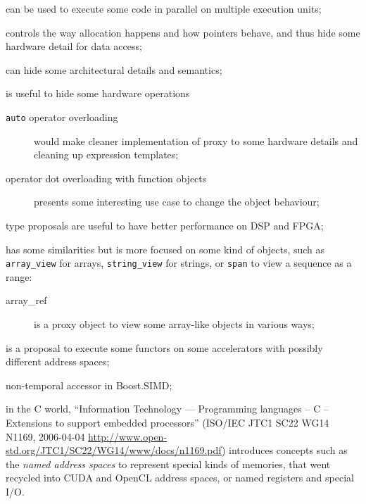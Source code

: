 \documentclass[a4paper]{article}
\begin{document}
\begin{description}
\item[\texttt{thread}] can be used to execute some code in parallel
  on multiple execution units;
\item[\texttt{allocator}] controls the way allocation happens and how
  pointers behave, and thus hide some hardware detail for data access;
\item[constructors and destructors] can hide some architectural details
  and semantics;
\item[operator overloading] is useful to hide some hardware
  operations
  \begin{description}
  \item[\texttt{auto} operator overloading] would make cleaner
    implementation of proxy to some hardware details and cleaning up
    expression templates;
  \item[operator dot overloading with function objects]
    \cite{C++:P0060R0:function_operator_dot} presents some interesting
    use case to change the object behaviour;
  \end{description}
\item[fixed-point] type proposals are useful to have better
  performance on DSP and FPGA;
\item[the concept of view] has some similarities but is more focused
  on some kind of objects, such as \lstinline|array_view| for arrays,
  \lstinline|string_view| for strings, or \lstinline|span| to view a
  sequence as a range:
  \begin{description}
  \item[array\_ref] \cite{C++:P0009R1:array_ref} is a proxy object to
    view some array-like objects in various ways;
  \end{description}
\item[SYCL] is a proposal to execute some functors on some
  accelerators with possibly different address spaces;
\item non-temporal accessor in Boost.SIMD;
\item[ISO/IEC TR 18037] in the C world, ``Information Technology ---
  Programming languages -- C -- Extensions to support embedded
  processors'' (ISO/IEC JTC1 SC22 WG14 N1169, 2006-04-04
  \url{http://www.open-std.org/JTC1/SC22/WG14/www/docs/n1169.pdf})
  introduces concepts such as the \emph{named address spaces} to
  represent special kinds of memories, that went recycled into CUDA
  and OpenCL address spaces, or named registers and special I/O.
\end{description}
\end{document}
